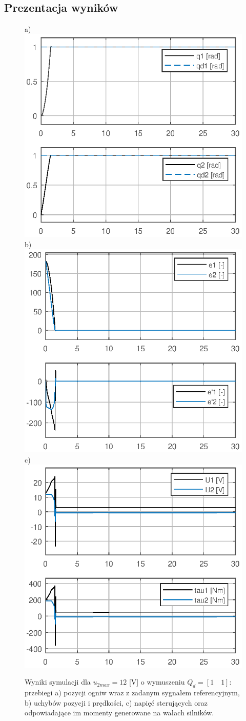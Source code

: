\documentclass[12pt, a4paper, polish]{article}
\begin{document}
	\subsection{Prezentacja wyników}
	\begin{figure}[h]\centering
		a) \includegraphics[width=0.30\columnwidth]{SRManCw4/SRManL4_ZADANIE2/figs/01Pozycje_U12} b)\includegraphics[width=0.30\columnwidth]{SRManCw4/SRManL4_ZADANIE2/figs/01Uchyby_U12} c)\includegraphics[width=0.30\columnwidth]{SRManCw4/SRManL4_ZADANIE2/figs/01Sygnaly_U12}\caption{
			Wyniki symulacji dla $u_{2max}=12$ [V] o wymuszeniu $Q_d=[1\quad1]$: przebiegi a) pozycji ogniw wraz z zadanym sygnałem referencyjnym, b) uchybów pozycji i prędkości, c)  napięć sterujących oraz odpowiadające im momenty generowane na wałach silników.}\label{fig:hiperprostopadloscian12v}
	\end{figure}
\end{document}
